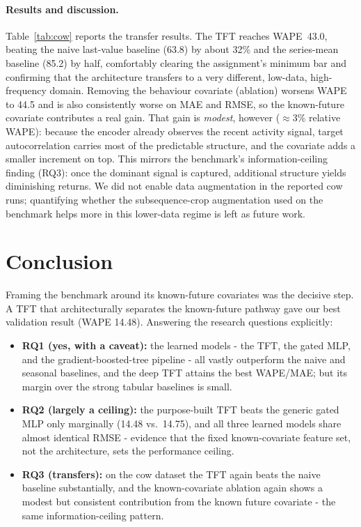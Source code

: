 \documentclass[11pt]{article}
\begin{document}
\paragraph{Results and discussion.} Table~\ref{tab:cow} reports the transfer results. The TFT reaches
WAPE~43.0, beating the naive last-value baseline (63.8) by about 32\% and the series-mean baseline
(85.2) by half, comfortably clearing the assignment's minimum bar and confirming that the
architecture transfers to a very different, low-data, high-frequency domain. Removing the behaviour
covariate (ablation) worsens WAPE to 44.5 and is also consistently worse on MAE and RMSE, so the
known-future covariate contributes a real gain. That gain is \emph{modest}, however
($\approx$3\% relative WAPE): because the encoder already observes the recent activity signal, target
autocorrelation carries most of the predictable structure, and the covariate adds a smaller increment
on top. This mirrors the benchmark's information-ceiling finding (RQ3): once the dominant signal is
captured, additional structure yields diminishing returns. We did not enable data augmentation in the
reported cow runs; quantifying whether the subsequence-crop augmentation used on the benchmark helps
more in this lower-data regime is left as future work.


\section{Conclusion}

Framing the benchmark around its known-future covariates was the decisive step. A TFT that
architecturally separates the known-future pathway gave our best validation result (WAPE 14.48).
Answering the research questions explicitly:
\begin{itemize}[nosep,leftmargin=1.5em]
  \item \textbf{RQ1 (yes, with a caveat):} the learned models - the TFT, the gated MLP, and the
  gradient-boosted-tree pipeline - all vastly outperform the naive and seasonal baselines, and the
  deep TFT attains the best WAPE/MAE; but its margin over the strong tabular baselines is small.
  \item \textbf{RQ2 (largely a ceiling):} the purpose-built TFT beats the generic gated MLP only
  marginally (14.48 vs.\ 14.75), and all three learned models share almost identical RMSE - evidence
  that the fixed known-covariate feature set, not the architecture, sets the performance ceiling.
  \item \textbf{RQ3 (transfers):} on the cow dataset the TFT again beats the naive baseline
  substantially, and the known-covariate ablation again shows a modest but consistent contribution
  from the known future covariate - the same information-ceiling pattern.
\end{itemize}
\end{document}
